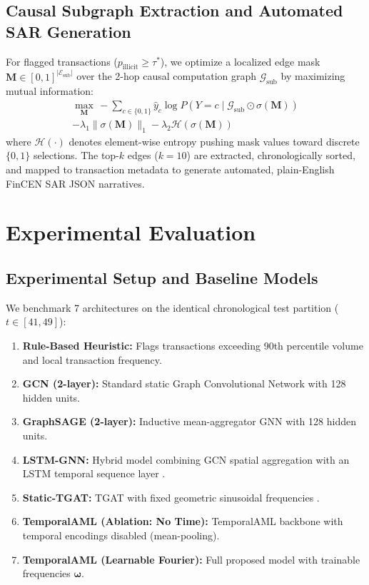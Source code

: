\documentclass[conference]{IEEEtran}
\begin{document}
\subsection{Causal Subgraph Extraction and Automated SAR Generation}
For flagged transactions ($p_{\text{illicit}} \ge \tau^*$), we optimize a localized edge mask $\mathbf{M} \in [0, 1]^{|\mathcal{E}_{\text{sub}}|}$ over the 2-hop causal computation graph $\mathcal{G}_{\text{sub}}$ by maximizing mutual information:
\begin{multline}
\max_{\mathbf{M}} \, -\sum_{c \in \{0, 1\}} \hat{y}_c \log P(Y = c \mid \mathcal{G}_{\text{sub}} \odot \sigma(\mathbf{M})) \\
- \lambda_1 \|\sigma(\mathbf{M})\|_1 - \lambda_2 \mathcal{H}(\sigma(\mathbf{M}))
\label{eq:gnnexplainer}
\end{multline}
where $\mathcal{H}(\cdot)$ denotes element-wise entropy pushing mask values toward discrete $\{0, 1\}$ selections. The top-$k$ edges ($k=10$) are extracted, chronologically sorted, and mapped to transaction metadata to generate automated, plain-English FinCEN SAR JSON narratives.

\section{Experimental Evaluation}

\subsection{Experimental Setup and Baseline Models}
We benchmark 7 architectures on the identical chronological test partition ($t \in [41, 49]$):
\begin{enumerate}
    \item \textbf{Rule-Based Heuristic:} Flags transactions exceeding 90th percentile volume and local transaction frequency.
    \item \textbf{GCN (2-layer):} Standard static Graph Convolutional Network \cite{kipf2017gcn} with 128 hidden units.
    \item \textbf{GraphSAGE (2-layer):} Inductive mean-aggregator GNN \cite{hamilton2017graphsage} with 128 hidden units.
    \item \textbf{LSTM-GNN:} Hybrid model combining GCN spatial aggregation with an LSTM temporal sequence layer \cite{pareja2020evolvegcn}.
    \item \textbf{Static-TGAT:} TGAT with fixed geometric sinusoidal frequencies \cite{xu2020tgat}.
    \item \textbf{TemporalAML (Ablation: No Time):} TemporalAML backbone with temporal encodings disabled (mean-pooling).
    \item \textbf{TemporalAML (Learnable Fourier):} Full proposed model with trainable frequencies $\boldsymbol{\omega}$.
\end{enumerate}
\end{document}
